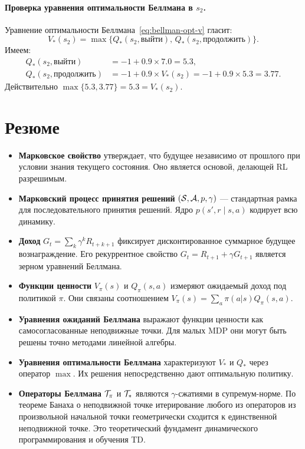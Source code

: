 \begin{example}
\paragraph{Проверка уравнения оптимальности Беллмана в $s_2$.}
Уравнение оптимальности Беллмана~\eqref{eq:bellman-opt-v} гласит:
\[
V_*(s_2)
= \max\bigl\{Q_*(s_2, \mbox{выйти}),\, Q_*(s_2, \mbox{продолжить})\bigr\}.
\]
Имеем:
\begin{align*}
Q_*(s_2, \mbox{выйти}) &= -1 + 0.9 \times 7.0 = 5.3, \\
Q_*(s_2, \mbox{продолжить}) &= -1 + 0.9 \times V_*(s_2) = -1 + 0.9 \times 5.3 = 3.77.
\end{align*}
Действительно $\max\{5.3, 3.77\} = 5.3 = V_*(s_2)$. \checkmark
\end{example}


\section{Резюме}
\label{sec:mdp-summary}

\begin{itemize}[leftmargin=*]
  \item \textbf{Марковское свойство} утверждает, что будущее независимо от прошлого при условии знания текущего состояния. Оно является основой, делающей RL разрешимым.
  \item \textbf{Марковский процесс принятия решений} $(\mathcal{S}, \mathcal{A}, p, \gamma)$ — стандартная рамка для последовательного принятия решений. Ядро $p(s', r \mid s, a)$ кодирует всю динамику.
  \item \textbf{Доход} $G_t = \sum_k \gamma^k R_{t+k+1}$ фиксирует дисконтированное суммарное будущее вознаграждение. Его рекуррентное свойство $G_t = R_{t+1} + \gamma G_{t+1}$ является зерном уравнений Беллмана.
  \item \textbf{Функции ценности} $V_\pi(s)$ и $Q_\pi(s,a)$ измеряют ожидаемый доход под политикой $\pi$. Они связаны соотношением $V_\pi(s) = \sum_a \pi(a|s) Q_\pi(s,a)$.
  \item \textbf{Уравнения ожиданий Беллмана} выражают функции ценности как самосогласованные неподвижные точки. Для малых MDP они могут быть решены точно методами линейной алгебры.
  \item \textbf{Уравнения оптимальности Беллмана} характеризуют $V_*$ и $Q_*$ через оператор $\max$. Их решения непосредственно дают оптимальную политику.
  \item \textbf{Операторы Беллмана} $\mathcal{T}_\pi$ и $\mathcal{T}_*$ являются $\gamma$-сжатиями в супремум-норме. По теореме Банаха о неподвижной точке итерирование любого из операторов из произвольной начальной точки геометрически сходится к единственной неподвижной точке. Это теоретический фундамент динамического программирования и обучения TD.
\end{itemize}


